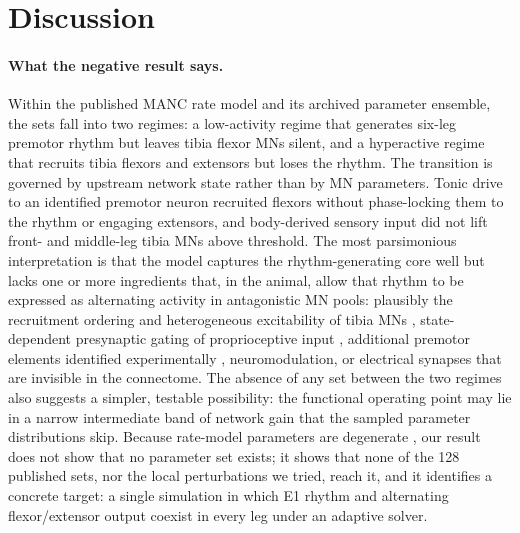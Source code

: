 \documentclass[11pt]{article}
\begin{document}
\section{Discussion}

\paragraph{What the negative result says.} Within the published MANC rate model and its archived parameter ensemble, the sets fall into two regimes: a low-activity regime that generates six-leg premotor rhythm but leaves tibia flexor MNs silent, and a hyperactive regime that recruits tibia flexors and extensors but loses the rhythm. The transition is governed by upstream network state rather than by MN parameters. Tonic drive to an identified premotor neuron recruited flexors without phase-locking them to the rhythm or engaging extensors, and body-derived sensory input did not lift front- and middle-leg tibia MNs above threshold. The most parsimonious interpretation is that the model captures the rhythm-generating core well \citep{pugliese2026} but lacks one or more ingredients that, in the animal, allow that rhythm to be expressed as alternating activity in antagonistic MN pools: plausibly the recruitment ordering and heterogeneous excitability of tibia MNs \citep{azevedo2020size}, state-dependent presynaptic gating of proprioceptive input \citep{dallmann2025presynaptic}, additional premotor elements identified experimentally \citep{sapkal2026}, neuromodulation, or electrical synapses that are invisible in the connectome. The absence of any set between the two regimes also suggests a simpler, testable possibility: the functional operating point may lie in a narrow intermediate band of network gain that the sampled parameter distributions skip. Because rate-model parameters are degenerate \citep{marder2011variability}, our result does not show that no parameter set exists; it shows that none of the 128 published sets, nor the local perturbations we tried, reach it, and it identifies a concrete target: a single simulation in which E1 rhythm and alternating flexor/extensor output coexist in every leg under an adaptive solver.
\end{document}
